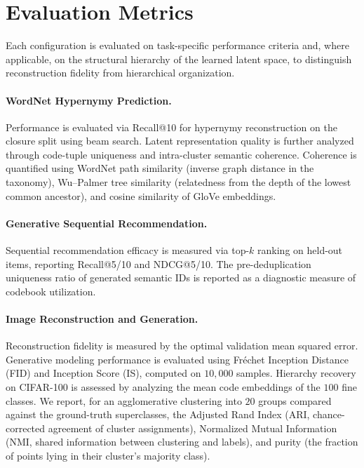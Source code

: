 \documentclass[12pt]{report}
\begin{document}
\section{Evaluation Metrics}
\label{sec:metrics}

Each configuration is evaluated on task-specific performance criteria and, where applicable, on the structural hierarchy of the learned latent space, to distinguish reconstruction fidelity from hierarchical organization.

\paragraph{WordNet Hypernymy Prediction.} Performance is evaluated via Recall@10 for hypernymy reconstruction on the closure split using beam search. Latent representation quality is further analyzed through code-tuple uniqueness and intra-cluster semantic coherence. Coherence is quantified using WordNet path similarity (inverse graph distance in the taxonomy), Wu--Palmer tree similarity (relatedness from the depth of the lowest common ancestor), and cosine similarity of GloVe embeddings.

\paragraph{Generative Sequential Recommendation.} Sequential recommendation efficacy is measured via top-$k$ ranking on held-out items, reporting Recall@5/10 and NDCG@5/10. The pre-deduplication uniqueness ratio of generated semantic IDs is reported as a diagnostic measure of codebook utilization.

\paragraph{Image Reconstruction and Generation.} Reconstruction fidelity is measured by the optimal validation mean squared error. Generative modeling performance is evaluated using Fr\'echet Inception Distance (FID) and Inception Score (IS), computed on $10{,}000$ samples. Hierarchy recovery on CIFAR-100 is assessed by analyzing the mean code embeddings of the $100$ fine classes. We report, for an agglomerative clustering into $20$ groups compared against the ground-truth superclasses, the Adjusted Rand Index (ARI, chance-corrected agreement of cluster assignments), Normalized Mutual Information (NMI, shared information between clustering and labels), and purity (the fraction of points lying in their cluster's majority class).
\end{document}
